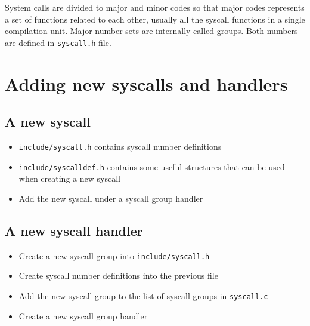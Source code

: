 System calls are divided to major and minor codes so that major codes represents
a set of functions related to each other, usually all the syscall functions in a
single compilation unit. Major number sets are internally called groups. Both
numbers are defined in \verb+syscall.h+ file.


\chapter{Adding new syscalls and handlers}

\section{A new syscall}

\begin{itemize}
\item \verb+include/syscall.h+ contains syscall number definitions
\item \verb+include/syscalldef.h+ contains some useful structures that can be used when
      creating a new syscall
\item Add the new syscall under a syscall group handler
\end{itemize}

\section{A new syscall handler}

\begin{itemize}
\item Create a new syscall group into \verb+include/syscall.h+
\item Create syscall number definitions into the previous file
\item Add the new syscall group to the list of syscall groups in \verb+syscall.c+
\item Create a new syscall group handler
\end{itemize}



